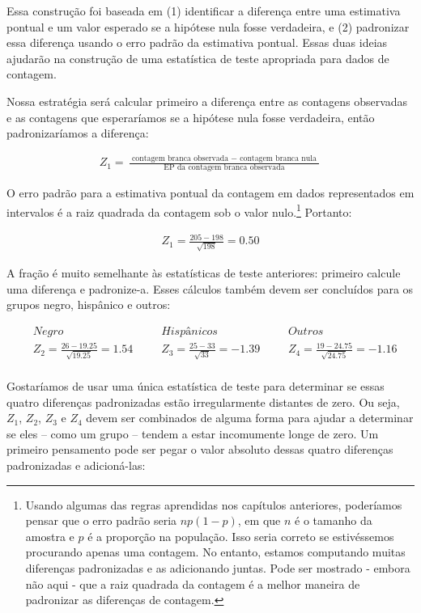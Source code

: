 \documentclass[
]{book}
\theoremstyle{definition}
\theoremstyle{definition}
\theoremstyle{definition}
\theoremstyle{definition}
\theoremstyle{remark}
\begin{document}
Essa construção foi baseada em (1) identificar a diferença entre uma estimativa pontual e um valor esperado se a hipótese nula fosse verdadeira, e (2) padronizar essa diferença usando o erro padrão da estimativa pontual. Essas duas ideias ajudarão na construção de uma estatística de teste apropriada para dados de contagem.

Nossa estratégia será calcular primeiro a diferença entre as contagens observadas e as contagens que esperaríamos se a hipótese nula fosse verdadeira, então padronizaríamos a diferença:

\begin{align*}
Z_{1} = \frac{\text{ contagem branca observada } - \text{ contagem branca nula }}
                {\text{EP da contagem branca observada}}
\end{align*}

O erro padrão para a estimativa pontual da contagem em dados representados em intervalos é a raiz quadrada da contagem sob o valor nulo.\footnote{Usando algumas das regras aprendidas nos capítulos anteriores, poderíamos pensar que o erro padrão seria \(np (1 -p)\), em que \(n\) é o tamanho da amostra e \(p\) é a proporção na população. Isso seria correto se estivéssemos procurando apenas uma contagem. No entanto, estamos computando muitas diferenças padronizadas e as adicionando juntas. Pode ser mostrado - embora não aqui - que a raiz quadrada da contagem é a melhor maneira de padronizar as diferenças de contagem.} Portanto:

\begin{align*}
Z_1 = \frac{205 - 198}{\sqrt{198}} = 0.50
\end{align*}

A fração é muito semelhante às estatísticas de teste anteriores: primeiro calcule uma diferença e padronize-a. Esses cálculos também devem ser concluídos para os grupos negro, hispânico e outros:

\begin{align*}
&Negro && Hispânicos    &&Outros \\
& Z_2 = \frac{26-19.25}{\sqrt{19.25}}=1.54\ \ \ \ 
    && Z_3 = \frac{25-33}{\sqrt{33}}=-1.39\ \ \ \ 
    && Z_4 = \frac{19-24.75}{\sqrt{24.75}}=-1.16 \\
\end{align*}

Gostaríamos de usar uma única estatística de teste para determinar se essas quatro diferenças padronizadas estão irregularmente distantes de zero. Ou seja, \(Z_1\), \(Z_2\), \(Z_3\) e \(Z_4\) devem ser combinados de alguma forma para ajudar a determinar se eles -- como um grupo -- tendem a estar incomumente longe de zero. Um primeiro pensamento pode ser pegar o valor absoluto dessas quatro diferenças padronizadas e adicioná-las:
\end{document}
